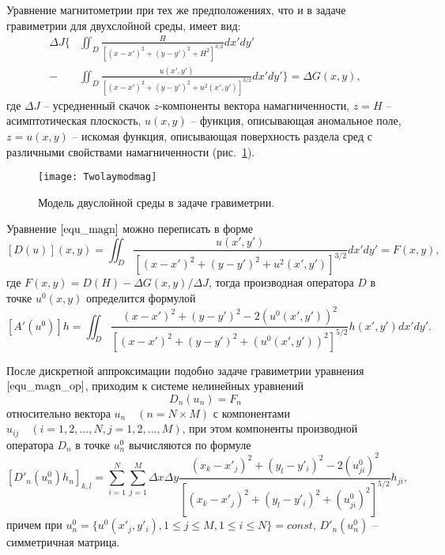 Уравнение магнитометрии при тех же предположениях, что и в задаче гравиметрии для двухслойной среды, имеет вид:
\begin{equation}\label{equ_magn}\begin{aligned}
\Delta J  \bigg\{&\iint_{D} \frac{H}{[(x-x')^2+(y-y')^2+H^2]^{3/2}}dx'dy' \\
- &\iint_{D} \frac{u(x',y')}{[(x-x')^2+(y-y')^2+u^2(x',y')]^{3/2}}dx'dy' \bigg\}=\Delta G(x,y),
\end{aligned} \end{equation}
где $\Delta J$ -- усредненный скачок $z$-компоненты вектора намагниченности, $z=H$ -- асимптотическая плоскость, $u(x,y)$ -- функция, описывающая аномальное поле, $z=u(x,y)$ -- искомая функция, описывающая поверхность раздела сред с различными свойствами намагниченности (рис.~\ref{fig:twolayermag}). 
\begin{figure}
	\centering
	\texttt{[image: Twolaymodmag]}
	\caption{Модель двуслойной среды в задаче гравиметрии.}
	\label{fig:twolayermag}
\end{figure}
Уравнение $\eqref{equ_magn}$ можно переписать в форме
\begin{equation}\label{equ_magn_op}
[D(u)](x,y)= \iint_{D} \frac{u(x',y')}{[(x-x')^2+(y-y')^2+u^2(x',y')]^{3/2}}dx'dy'=F(x,y),
\end{equation}
где $F(x,y)=D(H)-\Delta G(x,y)/\Delta J$, тогда производная оператора $D$ в точке $u^0(x,y)$ определится формулой
$$ [A'(u^0)]h=\iint_{D} \frac{(x-x')^2+(y-y')^2-2(u^0(x',y'))^2}{[(x-x')^2+(y-y')^2+(u^0(x',y'))^2]^{5/2}}h(x',y')dx'dy'. $$

После дискретной аппроксимации подобно задаче гравиметрии уравнения $\eqref{equ_magn_op}$, приходим к системе нелинейных уравнений
\begin{equation}\label{equ_snle_mag}
D_n(u_n)=F_n
\end{equation}
относительно вектора $u_n \quad (n=N\times M)$ с компонентами $u_{ij}\quad (i=1,2,...,N, j=1,2,...,M)$, при этом компоненты производной оператора $D_n$ в точке $u_{n}^{0}$ вычисляются по формуле
\begin{equation}\label{deriv_op_mag}
	[D'_n(u_{n}^{0})h_n]_{k,l}=\sum\limits_{i=1}^{N}\sum\limits_{j=1}^{M}
	\Delta x\Delta y\frac{(x_k-x'_j)^2+(y_l-y'_i)^2-2(u_{ji}^0)^2}{[(x_k-x'_j)^2+(y_l-y'_i)^2+(u_{ji}^0)^2]^{5/2}}h_{ji}, 
\end{equation}
причем при $u_{n}^{0}=\{u^0(x'_j, y'_i), 1\le j\le M, 1\le i\le N\}=const$, $D'_n(u_n^0)$ -- симметричная матрица.

